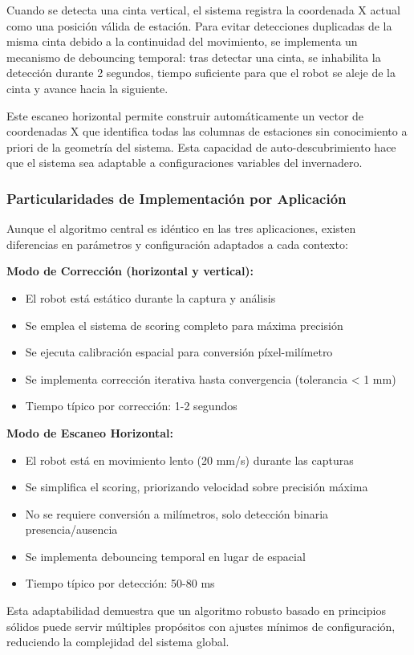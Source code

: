 Cuando se detecta una cinta vertical, el sistema registra la coordenada X actual como una posición válida de estación. Para evitar detecciones duplicadas de la misma cinta debido a la continuidad del movimiento, se implementa un mecanismo de debouncing temporal: tras detectar una cinta, se inhabilita la detección durante 2 segundos, tiempo suficiente para que el robot se aleje de la cinta y avance hacia la siguiente.

Este escaneo horizontal permite construir automáticamente un vector de coordenadas X que identifica todas las columnas de estaciones sin conocimiento a priori de la geometría del sistema. Esta capacidad de auto-descubrimiento hace que el sistema sea adaptable a configuraciones variables del invernadero.

\subsubsection{Particularidades de Implementación por Aplicación}

Aunque el algoritmo central es idéntico en las tres aplicaciones, existen diferencias en parámetros y configuración adaptados a cada contexto:

\textbf{Modo de Corrección (horizontal y vertical):}
\begin{itemize}
\item El robot está estático durante la captura y análisis
\item Se emplea el sistema de scoring completo para máxima precisión
\item Se ejecuta calibración espacial para conversión píxel-milímetro
\item Se implementa corrección iterativa hasta convergencia (tolerancia < 1 mm)
\item Tiempo típico por corrección: 1-2 segundos
\end{itemize}

\textbf{Modo de Escaneo Horizontal:}
\begin{itemize}
\item El robot está en movimiento lento (20 mm/s) durante las capturas
\item Se simplifica el scoring, priorizando velocidad sobre precisión máxima
\item No se requiere conversión a milímetros, solo detección binaria presencia/ausencia
\item Se implementa debouncing temporal en lugar de espacial
\item Tiempo típico por detección: 50-80 ms
\end{itemize}

Esta adaptabilidad demuestra que un algoritmo robusto basado en principios sólidos puede servir múltiples propósitos con ajustes mínimos de configuración, reduciendo la complejidad del sistema global.

